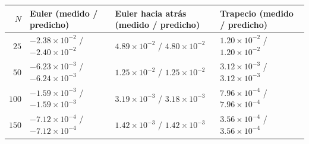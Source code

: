 \begin{tabular}{r l l l}
\toprule
\rowcolor{Azul1!50}
$N$ & Euler (medido / predicho) & Euler hacia atrás (medido / predicho) & Trapecio (medido / predicho) \\
\midrule
$25$ & $-2.38\times10^{-2}$ / $-2.40\times10^{-2}$ & $4.89\times10^{-2}$ / $4.80\times10^{-2}$ & $1.20\times10^{-2}$ / $1.20\times10^{-2}$ \\
$50$ & $-6.23\times10^{-3}$ / $-6.24\times10^{-3}$ & $1.25\times10^{-2}$ / $1.25\times10^{-2}$ & $3.12\times10^{-3}$ / $3.12\times10^{-3}$ \\
$100$ & $-1.59\times10^{-3}$ / $-1.59\times10^{-3}$ & $3.19\times10^{-3}$ / $3.18\times10^{-3}$ & $7.96\times10^{-4}$ / $7.96\times10^{-4}$ \\
$150$ & $-7.12\times10^{-4}$ / $-7.12\times10^{-4}$ & $1.42\times10^{-3}$ / $1.42\times10^{-3}$ & $3.56\times10^{-4}$ / $3.56\times10^{-4}$ \\
\bottomrule
\end{tabular}
